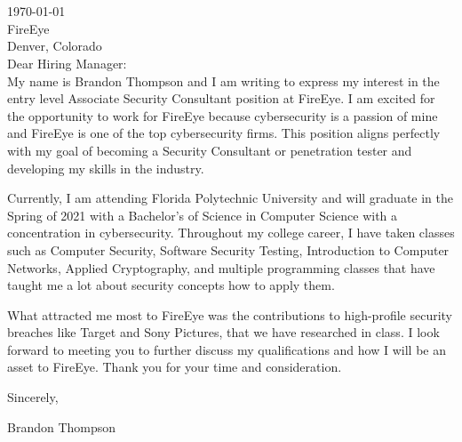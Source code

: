 \documentclass{resume} %
\begin{document}

\begin{rSection}{}
\ \\\
\\
\today \\
FireEye\\
Denver, Colorado\\


Dear Hiring Manager: \\

My name is Brandon Thompson and I am writing to express my interest in the entry level Associate Security Consultant position at FireEye.
I am excited for the opportunity to work for FireEye because cybersecurity is a passion of mine and FireEye is one of the top cybersecurity firms.
This position aligns perfectly with my goal of becoming a Security Consultant or penetration tester and developing my skills in the industry.

Currently, I am attending Florida Polytechnic University and will graduate in the Spring of 2021 with a Bachelor's of Science in Computer Science with a concentration in cybersecurity.
Throughout my college career, I have taken classes such as Computer Security, Software Security Testing, Introduction to Computer Networks, Applied Cryptography, and multiple programming classes that have taught me a lot about security concepts how to apply them.

What attracted me most to FireEye was the contributions to high-profile security breaches like Target and Sony Pictures, that we have researched in class.
I look forward to meeting you to further discuss my qualifications and how I will be an asset to FireEye.
Thank you for your time and consideration.


Sincerely,

Brandon Thompson


\end{rSection}
\end{document}
